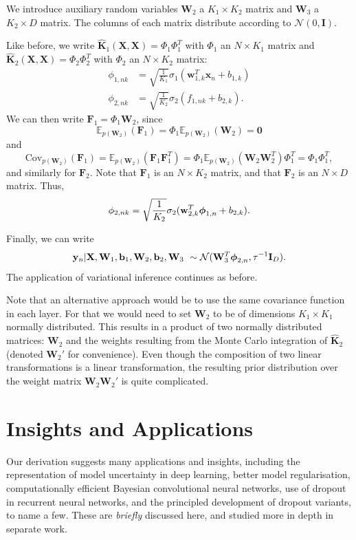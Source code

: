 \documentclass{article} %
\newcommand{\N}{\mathcal{N}}
\newcommand{\x}{\mathbf{x}}
\newcommand{\Bb}{\mathbf{b}}
\newcommand{\y}{\mathbf{y}}
\newcommand{\w}{\mathbf{w}}
\newcommand{\W}{\mathbf{W}}
\newcommand{\X}{\mathbf{X}}
\newcommand{\F}{\mathbf{F}}
\newcommand{\I}{\mathbf{I}}
\newcommand{\bz}{\mathbf{0}}
\newcommand{\bphi}{\text{\boldmath$\phi$}}
\newcommand{\Kh}{\widehat{\mathbf{K}}}
\newcommand{\Cov}{\text{Cov}}
\theoremstyle{definition}
\begin{document}
We introduce auxiliary random variables $\W_2$ a $K_1 \times K_2$ matrix and $\W_3$ a $K_2 \times D$ matrix. The columns of each matrix distribute according to $\N(0, \I)$.

Like before, we write $\Kh_1(\X, \X) = \Phi_1 \Phi_1^T$ with $\Phi_1$ an $N \times K_1$ matrix and $\Kh_2(\X, \X) = \Phi_2 \Phi_2^T$ with $\Phi_2$ an $N \times K_2$ matrix:
\begin{align*}
\phi_{1,nk} &= \sqrt{\frac{1}{K_1}} \sigma_1(\w_{1,k}^T \x_n + b_{1,k}) \\
\phi_{2,nk} &= \sqrt{\frac{1}{K_2}} \sigma_2(f_{1,nk} + b_{2,k}).
\end{align*}
We can then write $\F_{1} = \Phi_1 \W_2$, since 
$$\mathbb{E}_{p(\W_2)}(\F_1) = \Phi_1\mathbb{E}_{p(\W_2)} (\W_2) = \bz$$ 
and 
$$\Cov_{p(\W_2)} (\F_1) = \mathbb{E}_{p(\W_2)} (\F_1 \F_1^T) = \Phi_1 \mathbb{E}_{p(\W_2)} (\W_2 \W_2^T) \Phi_1^T = \Phi_1 \Phi_1^T,$$
and similarly for $\F_2$. Note that $\F_1$ is an $N \times K_2$ matrix, and that $\F_2$ is an $N \times D$ matrix.
Thus, 
$$\phi_{2,nk} = \sqrt{\frac{1}{K_2}} \sigma_2(\w_{2,k}^T \bphi_{1,n} + b_{2,k}).$$

Finally, we can write
\begin{align*}
\y_n | \X, \W_1, \Bb_1, \W_2, \Bb_2, \W_3 \ \sim \N(\W_{3}^T \bphi_{2,n}, \tau^{-1} \I_{D}).
\end{align*}
The application of variational inference continues as before.

Note that an alternative approach would be to use the same covariance function in each layer. For that we would need to set $\W_2$ to be of dimensions $K_1 \times K_1$ normally distributed. This results in a product of two normally distributed matrices: $\W_2$ and the weights resulting from the Monte Carlo integration of $\Kh_2$ (denoted $\W_2'$ for convenience). Even though the composition of two linear transformations is a linear transformation, the resulting prior distribution over the weight matrix $\W_2\W_2'$ is quite complicated.

\section{Insights and Applications}

Our derivation suggests many applications and insights, including the representation of model uncertainty in deep learning, better model regularisation, computationally efficient Bayesian convolutional neural networks, use of dropout in recurrent neural networks, and the principled development of dropout variants, to name a few. These are \textit{briefly} discussed here, and studied more in depth in separate work.
\end{document}
